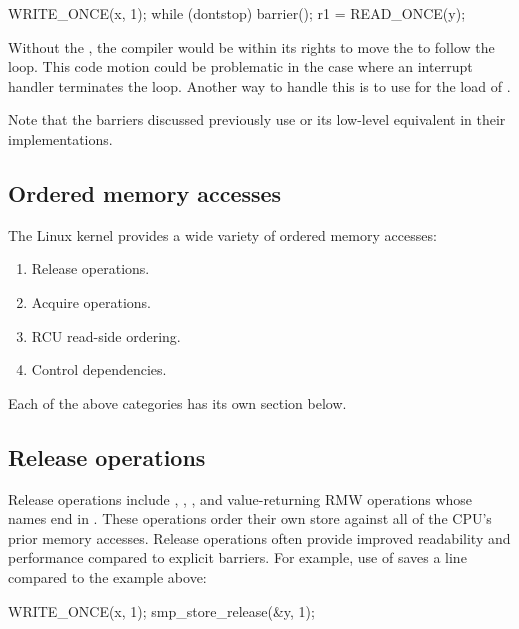 \begin{VerbatimU}
	WRITE_ONCE(x, 1);
	while (dontstop)
		barrier();
	r1 = READ_ONCE(y);
\end{VerbatimU}

Without the , the compiler would be within its rights to move the
 to follow the loop.
This code motion could be problematic in the case where an interrupt
handler terminates the loop.
Another way to handle this is to use  for the load of
.

Note that the barriers discussed previously use  or its low-level
equivalent in their implementations.


\subsection{Ordered memory accesses}

The Linux kernel provides a wide variety of ordered memory accesses:

\begin{enumerate}
 \item	Release operations.

 \item	Acquire operations.

 \item	RCU read-side ordering.

 \item	Control dependencies.
\end{enumerate}

Each of the above categories has its own section below.


\subsection{Release operations}

Release operations include , ,
, and value-returning RMW operations whose names
end in .
These operations order their own store against all of the CPU's prior
memory accesses.
Release operations often provide improved readability and performance
compared to explicit barriers.
For example, use of  saves a line compared to the
 example above:

\begin{VerbatimU}
	WRITE_ONCE(x, 1);
	smp_store_release(&y, 1);
\end{VerbatimU}

